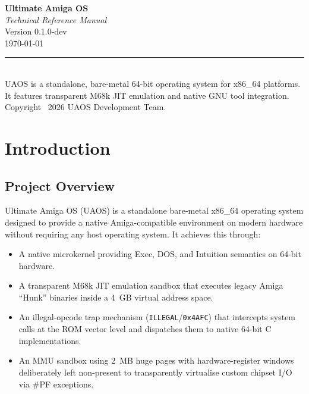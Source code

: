 \documentclass[11pt,a4paper]{report}
\begin{document}

\begin{titlepage}
    \centering
    \vspace*{3cm}
    {\Huge\bfseries Ultimate Amiga OS\\[0.5em]}
    {\Large\itshape Technical Reference Manual\\[2em]}
    {\large Version 0.1.0-dev\\[0.5em]}
    {\large \today\\[3em]}
    \rule{\linewidth}{0.5pt}\\[1em]
    {\normalsize
        UAOS is a standalone, bare-metal 64-bit operating system for x86\_64 platforms.\\
        It features transparent M68k JIT emulation and native GNU tool integration.
    }
    \vfill
    {\small Copyright \textcopyright\ 2026 UAOS Development Team.}
\end{titlepage}

\tableofcontents
\listoffigures
\listoftables

\chapter{Introduction}

\section{Project Overview}

Ultimate Amiga OS (UAOS) is a standalone bare-metal x86\_64 operating system
designed to provide a native Amiga-compatible environment on modern hardware
without requiring any host operating system.  It achieves this through:

\begin{itemize}
    \item A native microkernel providing Exec, DOS, and Intuition
          semantics on 64-bit hardware.
    \item A transparent M68k JIT emulation sandbox that executes legacy
          Amiga ``Hunk'' binaries inside a 4~GB virtual address space.
    \item An illegal-opcode trap mechanism (\texttt{ILLEGAL}/\texttt{0x4AFC})
          that intercepts system calls at the ROM vector level and dispatches
          them to native 64-bit C implementations.
    \item An MMU sandbox using 2~MB huge pages with hardware-register
          windows deliberately left non-present to transparently virtualise
          custom chipset I/O via \#PF exceptions.
\end{itemize}
\end{document}
